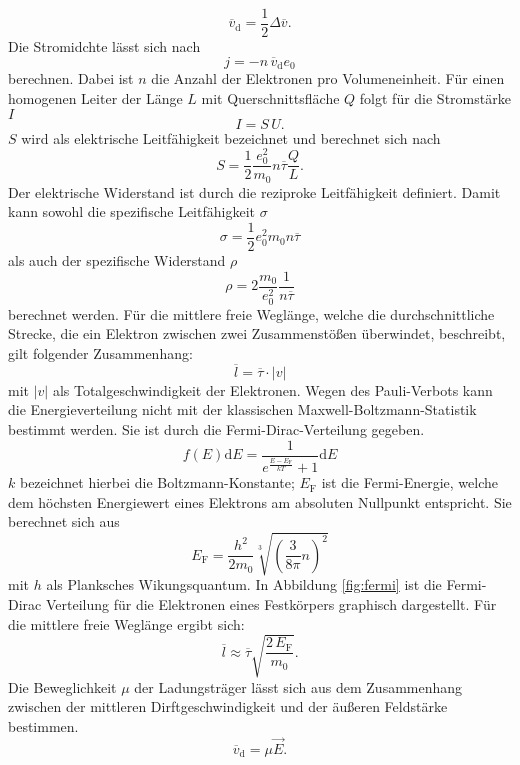 \begin{equation}
\overline{v}_\mathrm{d} = \frac{1}{2}\Delta \overline{v}.
\end{equation}
Die Stromidchte lässt sich nach
\begin{equation}
  j=-n\,\overline{v}_\mathrm{d} e_0
\end{equation}
berechnen. Dabei ist $n$ die Anzahl der Elektronen pro Volumeneinheit.
Für einen homogenen Leiter der Länge $L$ mit Querschnittsfläche $Q$ folgt für die Stromstärke $I$
\begin{equation}
  I=S\,U.
\end{equation}
$S$ wird als elektrische Leitfähigkeit bezeichnet und berechnet sich nach
\begin{equation}
  S=\frac{1}{2}\frac{e_0 ^2}{m_0}n\overline{\tau}\frac{Q}{L}.
\end{equation}
Der elektrische Widerstand ist durch die reziproke Leitfähigkeit definiert. Damit kann sowohl die spezifische Leitfähigkeit $\sigma$
\begin{equation}
  \sigma = \frac{1}{2}{e_0 ^2}{m_0}n\overline{\tau}
\end{equation}
als auch der spezifische Widerstand $\rho$
\begin{equation}
  \rho = 2 \frac{m_0}{e_0 ^2}\frac{1}{n\overline{\tau}}
\end{equation}
berechnet werden.
Für die mittlere freie Weglänge, welche die durchschnittliche Strecke, die ein Elektron zwischen zwei Zusammenstößen überwindet, beschreibt, gilt folgender Zusammenhang:
\begin{equation}
  \overline{l}=\overline{\tau}\cdot|v|
\end{equation}
mit $|v|$ als Totalgeschwindigkeit der Elektronen.
Wegen des Pauli-Verbots kann die Energieverteilung nicht mit der klassischen Maxwell-Boltzmann-Statistik bestimmt werden. Sie ist durch die Fermi-Dirac-Verteilung gegeben.
\begin{equation}
  f(E)\mathrm{d}E= \frac{1}{e^{\frac{E-E_\mathrm{F}}{kT}}+1}\mathrm{d}E
\end{equation}
$k$ bezeichnet hierbei  die Boltzmann-Konstante; $E_\mathrm{F}$ ist die Fermi-Energie, welche dem höchsten Energiewert eines Elektrons am absoluten Nullpunkt entspricht. Sie berechnet sich aus
\begin{equation}
E_\mathrm{F}=\frac{h^2}{2m_0}\sqrt[3]{\left( \frac{3}{8\pi}n\right)^2}
\end{equation}
mit $h$ als Planksches Wikungsquantum.
In Abbildung \ref{fig:fermi} ist die Fermi-Dirac Verteilung für die Elektronen eines Festkörpers graphisch dargestellt.
Für die mittlere freie Weglänge ergibt sich:
\begin{equation}
\overline{l} \approx \overline{\tau}\sqrt{\frac{2\,E_\mathrm{F}}{m_0}}.
\end{equation}
Die Beweglichkeit $\mu$ der Ladungsträger lässt sich aus dem Zusammenhang zwischen der mittleren Dirftgeschwindigkeit und der äußeren Feldstärke bestimmen.
\begin{equation}
\overline{v}_\mathrm{d}=\mu \vec{E}.
\end{equation}

